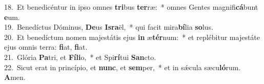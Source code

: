 {18.~}Et benedicéntur in ipso omnes \textbf{tri}bus \textbf{ter}ræ:~* omnes Gentes magnifi\textbf{cá}bunt \textbf{e}um.\\
{19.~}Benedíctus Dóminus, \textbf{De}us \textbf{Is}\textbf{ra}ël,~* qui facit mira\textbf{bí}lia \textbf{so}lus.\\
{20.~}Et benedíctum nomen majestátis ejus \textbf{in} æ\textbf{tér}num:~* et replébitur majestáte ejus omnis terra: \textbf{fi}at, \textbf{fi}at.\\
{21.~}Glória \textbf{Pa}tri, et \textbf{Fí}\textbf{li}o,~* et Spi\textbf{rí}tui \textbf{San}cto.\\
{22.~}Sicut erat in princípio, et \textbf{nunc}, et \textbf{sem}per,~* et in sǽcula sæcu\textbf{ló}rum. \textbf{A}men.\\
